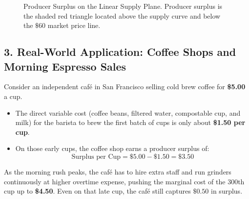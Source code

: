 \documentclass[11pt,letterpaper]{article}
\begin{document}
\begin{figure}[htbp]
\centering
{}
\caption{Producer Surplus on the Linear Supply Plane. Producer surplus is the shaded red triangle located above the supply curve and below the $\$60$ market price line.}
\label{fig:producer_surplus}
\end{figure}

\subsection*{3. Real-World Application: Coffee Shops and Morning Espresso Sales}
Consider an independent café in San Francisco selling cold brew coffee for \textbf{\$5.00} a cup. 
\begin{itemize}
    \item The direct variable cost (coffee beans, filtered water, compostable cup, and milk) for the barista to brew the first batch of cups is only about \textbf{\$1.50 per cup}.
    \item On those early cups, the coffee shop earns a producer surplus of:
    \[
    \text{Surplus per Cup} = \$5.00 - \$1.50 = \mathbf{\$3.50}
    \]
\end{itemize}
As the morning rush peaks, the café has to hire extra staff and run grinders continuously at higher overtime expense, pushing the marginal cost of the 300th cup up to \textbf{\$4.50}. Even on that late cup, the café still captures $\$0.50$ in surplus. 
\end{document}
